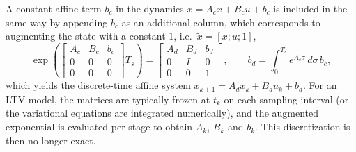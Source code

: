 A constant affine term $b_c$ in the dynamics $\dot{x} = A_c x + B_c u + b_c$ is included in the same way by appending $b_c$ as an additional column, which corresponds to augmenting the state with a constant $1$, i.e.\ $\tilde{x} = [x; u; 1]$,
\[
\exp\left(
\begin{bmatrix}
    A_c & B_c & b_c \\
    0   & 0   & 0   \\
    0   & 0   & 0
\end{bmatrix}
T_s
\right)
=
\begin{bmatrix}
    A_d & B_d & b_d \\
    0   & I   & 0   \\
    0   & 0   & 1
\end{bmatrix},
\qquad
b_d = \int_0^{T_s} e^{A_c \sigma} \, d\sigma \, b_c,
\]
which yields the discrete-time affine system $x_{k+1} = A_d x_k + B_d u_k + b_d$.
For an LTV model, the matrices are typically frozen at $t_k$ on each sampling interval (or the variational equations are integrated numerically), and the augmented exponential is evaluated per stage to obtain $A_k$, $B_k$ and $b_k$.
This discretization is then no longer exact.

\newpage

